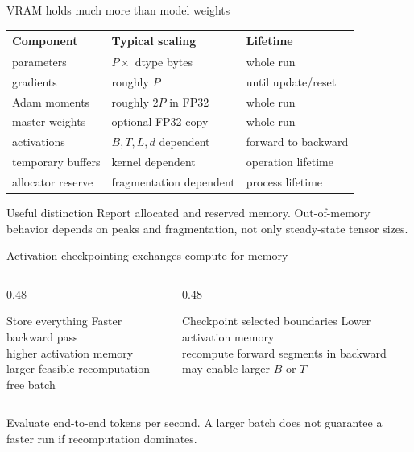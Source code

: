 \documentclass[handout]{beamer}
\begin{document}
\begin{frame}{VRAM holds much more than model weights}
  \small
  \begin{tabular}{lll}
    \toprule
    Component & Typical scaling & Lifetime \\
    \midrule
    parameters & $P\times$ dtype bytes & whole run \\
    gradients & roughly $P$ & until update/reset \\
    Adam moments & roughly $2P$ in FP32 & whole run \\
    master weights & optional FP32 copy & whole run \\
    activations & $B,T,L,d$ dependent & forward to backward \\
    temporary buffers & kernel dependent & operation lifetime \\
    allocator reserve & fragmentation dependent & process lifetime \\
    \bottomrule
  \end{tabular}
  \vfill
  \begin{block}{Useful distinction}
    Report allocated and reserved memory. Out-of-memory behavior depends on peaks and fragmentation, not only steady-state tensor sizes.
  \end{block}
\end{frame}

\begin{frame}{Activation checkpointing exchanges compute for memory}
  \begin{columns}[c]
    \begin{column}{0.48\linewidth}
      \begin{alertblock}{Store everything}
        Faster backward pass\\higher activation memory\\larger feasible recomputation-free batch
      \end{alertblock}
    \end{column}
    \begin{column}{0.48\linewidth}
      \begin{block}{Checkpoint selected boundaries}
        Lower activation memory\\recompute forward segments in backward\\may enable larger $B$ or $T$
      \end{block}
    \end{column}
  \end{columns}
  \vfill
  Evaluate end-to-end tokens per second. A larger batch does not guarantee a faster run if recomputation dominates.
\end{frame}
\end{document}
